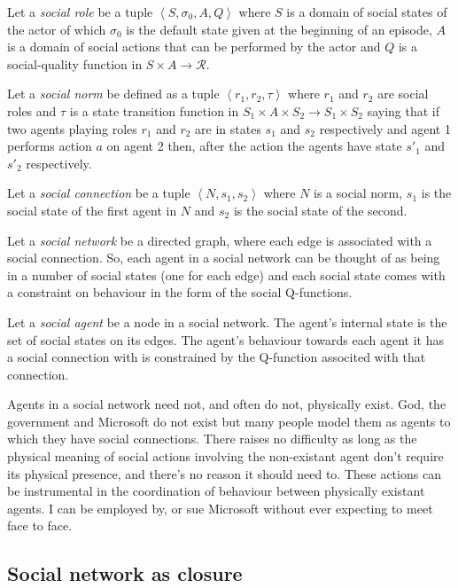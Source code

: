 \documentclass[a4paper]{article}
\begin{document}
Let a \textit{social role} be a tuple $\left<S, \sigma_0, A, Q\right>$ where $S$ is a domain of social states of the actor of which $\sigma_0$ is the default state given at the beginning of an episode, $A$ is a domain of social actions that can be performed by the actor and $Q$ is a social-quality function in $S \times A \to \mathcal{R}$. 

Let a \textit{social norm} be defined as a tuple $\left<r_1, r_2, \tau \right>$ where $r_1$ and $r_2$ are social roles and $\tau$ is a state transition function in $S_1 \times A \times S_2 \to S_1 \times S_2$ saying that if two agents playing roles $r_1$ and $r_2$ are in states $s_1$ and $s_2$ respectively and agent 1 performs action $a$ on agent 2 then, after the action the agents have state $s'_1$ and $s'_2$ respectively.

Let a \textit{social connection} be a tuple $\left<N, s_1, s_2 \right>$ where $N$ is a social norm, $s_1$ is the social state of the first agent in $N$ and $s_2$ is the social state of the second.

Let a \textit{social network} be a directed graph, where each edge is associated with a social connection. So, each agent in a social network can be thought of as being in a number of social states (one for each edge) and each social state comes with a constraint on behaviour in the form of the social Q-functions.

Let a \textit{social agent} be a node in a social network. The agent's internal state is the set of social states on its edges. The agent's behaviour towards each agent it has a social connection with is constrained by the Q-function associted with that connection.

Agents in a social network need not, and often do not, physically exist. God, the government and Microsoft do not exist but many people model them as agents to which they have social connections. There raises no difficulty as long as the physical meaning of social actions involving the non-existant agent don't require its physical presence, and there's no reason it should need to. These actions can be instrumental in the coordination of behaviour between physically existant agents. I can be employed by, or sue Microsoft without ever expecting to meet face to face.

\subsection{Social network as closure}
\end{document}
